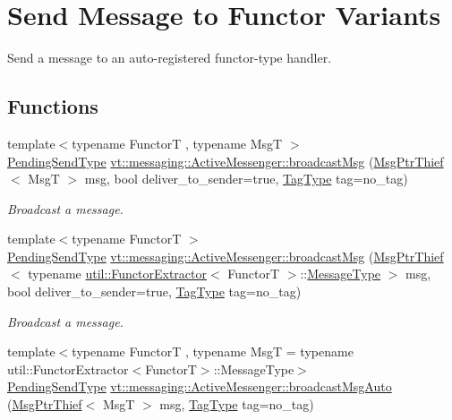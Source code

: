 \hypertarget{group__functorsend}{}\section{Send Message to Functor Variants}
\label{group__functorsend}


Send a message to an auto-\/registered functor-\/type handler.  


\subsection*{Functions}
\begin{DoxyCompactItemize}
\item 
{\footnotesize template$<$typename FunctorT , typename MsgT $>$ }\\\hyperlink{structvt_1_1messaging_1_1_active_messenger_a3626a6ca76d8ad4ec7c3b47a2c70d3a8}{Pending\+Send\+Type} \hyperlink{group__functorsend_ga880e93f0c239c1aa9c9ade805d75dd7a}{vt\+::messaging\+::\+Active\+Messenger\+::broadcast\+Msg} (\hyperlink{structvt_1_1messaging_1_1_msg_ptr_thief}{Msg\+Ptr\+Thief}$<$ MsgT $>$ msg, bool deliver\+\_\+to\+\_\+sender=true, \hyperlink{namespacevt_a84ab281dae04a52a4b243d6bf62d0e52}{Tag\+Type} tag=no\+\_\+tag)
\begin{DoxyCompactList}\small\item\em Broadcast a message. \end{DoxyCompactList}\item 
{\footnotesize template$<$typename FunctorT $>$ }\\\hyperlink{structvt_1_1messaging_1_1_active_messenger_a3626a6ca76d8ad4ec7c3b47a2c70d3a8}{Pending\+Send\+Type} \hyperlink{group__functorsend_gab47c5e564a5f8e286568cdb82b41c488}{vt\+::messaging\+::\+Active\+Messenger\+::broadcast\+Msg} (\hyperlink{structvt_1_1messaging_1_1_msg_ptr_thief}{Msg\+Ptr\+Thief}$<$ typename \hyperlink{structvt_1_1util_1_1_functor_extractor}{util\+::\+Functor\+Extractor}$<$ FunctorT $>$\+::\hyperlink{structvt_1_1messaging_1_1_active_messenger_a720a2b1e7462d414b2a51d9fe005eca9}{Message\+Type} $>$ msg, bool deliver\+\_\+to\+\_\+sender=true, \hyperlink{namespacevt_a84ab281dae04a52a4b243d6bf62d0e52}{Tag\+Type} tag=no\+\_\+tag)
\begin{DoxyCompactList}\small\item\em Broadcast a message. \end{DoxyCompactList}\item 
{\footnotesize template$<$typename FunctorT , typename MsgT  = typename util\+::\+Functor\+Extractor$<$\+Functor\+T$>$\+::\+Message\+Type$>$ }\\\hyperlink{structvt_1_1messaging_1_1_active_messenger_a3626a6ca76d8ad4ec7c3b47a2c70d3a8}{Pending\+Send\+Type} \hyperlink{group__functorsend_ga9337b80d48503a52676f80f86bc66cf2}{vt\+::messaging\+::\+Active\+Messenger\+::broadcast\+Msg\+Auto} (\hyperlink{structvt_1_1messaging_1_1_msg_ptr_thief}{Msg\+Ptr\+Thief}$<$ MsgT $>$ msg, \hyperlink{namespacevt_a84ab281dae04a52a4b243d6bf62d0e52}{Tag\+Type} tag=no\+\_\+tag)

\end{DoxyCompactItemize}
